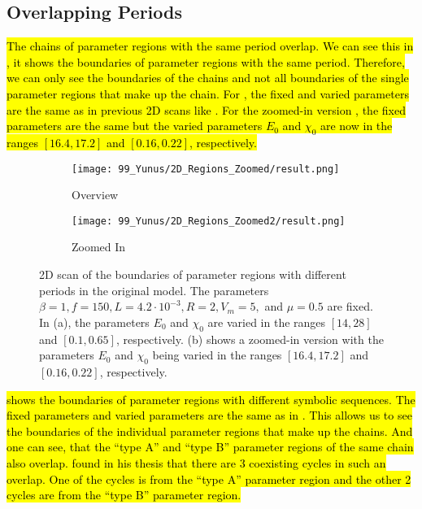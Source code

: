\subsection{Overlapping Periods}

\hl{
	The chains of parameter regions with the same period overlap.
	We can see this in , it shows the boundaries of parameter regions with the same period.
	Therefore, we can only see the boundaries of the chains and not all boundaries of the single parameter regions that make up the chain.
	For , the fixed and varied parameters are the same as in previous 2D scans like .
	For the zoomed-in version , the fixed parameters are the same but the varied parameters $E_0$ and $\chi_0$ are now in the ranges $[16.4, 17.2]$ and $[0.16, 0.22]$, respectively.
}

\begin{figure}
	\centering
	\begin{subfigure}{0.4\textwidth}
		\texttt{[image: 99\_Yunus/2D\_Regions\_Zoomed/result.png]}
		\caption{Overview}
		\label{fig:state.og.overlapping.chains.full}
	\end{subfigure}
	\begin{subfigure}{0.4\textwidth}
		\texttt{[image: 99\_Yunus/2D\_Regions\_Zoomed2/result.png]}
		\caption{Zoomed In}
		\label{fig:state.og.overlapping.chains.zoomed}
	\end{subfigure}
	\caption[2D scan of the boundaries of parameter regions with different periods in the original model]{
		2D scan of the boundaries of parameter regions with different periods in the original model.
		The parameters $\beta = 1, f = 150, L = 4.2 \cdot 10^{-3}, R = 2, V_m = 5,$ and $\mu = 0.5$ are fixed.
		In (a), the parameters $E_0$ and $\chi_0$ are varied in the ranges $[14, 28]$ and $[0.1, 0.65]$, respectively.
		(b) shows a zoomed-in version with the parameters $E_0$ and $\chi_0$ being varied in the ranges $[16.4, 17.2]$ and $[0.16, 0.22]$, respectively.
	}
	\label{fig:state.og.overlapping.chains}
\end{figure}

\hl{
	 shows the boundaries of parameter regions with different symbolic sequences.
	The fixed parameters and varied parameters are the same as in .
	This allows us to see the boundaries of the individual parameter regions that make up the chains.
	And one can see, that the ``type A'' and ``type B'' parameter regions of the same chain also overlap.
	 found in his thesis that there are 3 coexisting cycles in such an overlap.
	One of the cycles is from the ``type A'' parameter region and the other 2 cycles are from the ``type B'' parameter region.
}

